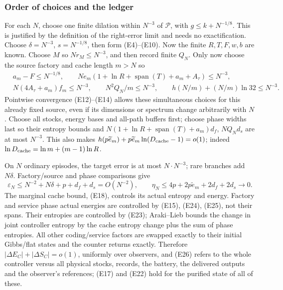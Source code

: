 \subsubsection{Order of choices and the ledger}
For each \(N\), choose one finite dilation within \(N^{-3}\) of
\(\mathcal P\), with \(g\le k+N^{-1/8}\). This is justified by the
definition of the right-error limit and needs no exactification.
Choose \(\delta=N^{-3}\), \(s=N^{-1/8}\), then form (E4)--(E10).
Now the finite \(R,T,F,w,b\) are known. Choose \(M\) so
\(Nr_M\le N^{-3}\), and then record finite \(Q_N\).
Only now choose the source factory and cache length \(m>N\) so
\[
 \begin{split}
 &a_m-F\le N^{-1/8},\qquad
 N e_m(1+\ln R+\operatorname{span}(T)+a_m+A_\tau)\le N^{-3},\\
 &N(4A_\tau+a_m) f_m\le N^{-3},\qquad
 N^2Q_N/m\le N^{-3},\qquad h(N/m)+(N/m)\ln32\le N^{-3}.
 \end{split}                                                   \tag{E25}
\]
Pointwise convergence (E12)--(E14) allows these simultaneous choices
for this already fixed source, even if its dimensions or spectrum
change arbitrarily with \(N\).
Choose all stocks, energy bases and all-path buffers first; choose
phase widths last so their entropy bounds and
\(N(1+\ln R+\operatorname{span}(T)+a_m)d_f\), \(NQ_Nd_s\)
are at most \(N^{-3}\). This also makes
\(h(p\widetilde e_m)+p\widetilde e_m\ln(D_{\rm cache}-1)=o(1)\);
indeed \(\ln D_{\rm cache}=\ln m+(m-1)\ln R\).

On \(N\) ordinary episodes, the target error is at most
\(N\cdot N^{-3}\); rare branches add \(N\delta\). Factory/source and
phase comparisons give
\[
\varepsilon_N\le N^{-2}+N\delta+p+d_f+d_s=O(N^{-2}),\qquad
\eta_N\le4p+2p\widetilde e_m+2d_f+2d_s\to0.         \tag{E26}
\]
The marginal cache bound, (E18), controls its actual entropy and
energy. Factory and service phase actual energies are controlled by
(E15), (E24), (E25), not their spans. Their entropies are controlled by
(E23); Araki--Lieb bounds the change in joint controller entropy by
the cache entropy change plus the sum of phase entropies.
All other coding/service factors are swapped exactly to their initial
Gibbs/flat states and the counter returns exactly. Therefore
\(|\Delta E_C|+|\Delta S_C|=o(1)\), uniformly over observers, and
(E26) refers to the whole controller versus all physical stocks, records, the battery, the delivered outputs and the observer's references; (E17) and (E22) hold for the purified state of all of these.

